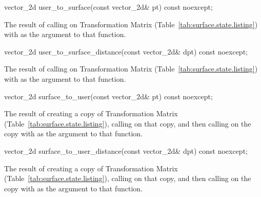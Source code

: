 \begin{itemdecl}
vector_2d user_to_surface(const vector_2d& pt) const noexcept;
\end{itemdecl}
\begin{itemdescr}
\pnum
\returns
The result of calling  on Transformation Matrix (Table~\ref{tab:surface.state.listing}) with  as the argument to that function.
\end{itemdescr}

\begin{itemdecl}
vector_2d user_to_surface_distance(const vector_2d& dpt) const noexcept;
\end{itemdecl}
\begin{itemdescr}
\pnum
\returns
The result of calling  on Transformation Matrix (Table~\ref{tab:surface.state.listing}) with  as the argument to that function.
\end{itemdescr}

\begin{itemdecl}
vector_2d surface_to_user(const vector_2d& pt) const noexcept;
\end{itemdecl}
\begin{itemdescr}
\pnum
\returns
The result of creating a copy of Transformation Matrix (Table~\ref{tab:surface.state.listing}), calling  on that copy, and then calling  on the copy with  as the argument to that function.
\end{itemdescr}

\begin{itemdecl}
vector_2d surface_to_user_distance(const vector_2d& dpt) const noexcept;
\end{itemdecl}
\begin{itemdescr}
\pnum
\returns
The result of creating a copy of Transformation Matrix (Table~\ref{tab:surface.state.listing}), calling  on that copy, and then calling  on the copy with  as the argument to that function.
\end{itemdescr}

